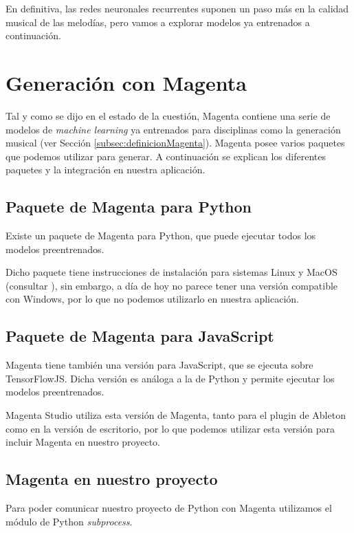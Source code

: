     En definitiva, las redes neuronales recurrentes suponen un paso más en la calidad musical de las melodías, pero vamos a explorar modelos ya entrenados a continuación.

\section{Generación con Magenta}
\label{sec:magenta}
Tal y como se dijo en el estado de la cuestión, Magenta contiene una serie de modelos de \textit{machine learning} ya entrenados para disciplinas como la generación musical (ver Sección \ref{subsec:definicionMagenta}). Magenta posee varios paquetes que podemos utilizar para generar. A continuación se explican los diferentes paquetes y la integración en nuestra aplicación.

    \subsection{Paquete de Magenta para Python}
    \label{subsec:magentaPython}
    Existe un paquete de Magenta para Python, que puede ejecutar todos los modelos preentrenados.

    Dicho paquete tiene instrucciones de instalación para sistemas Linux y MacOS (consultar \cite{MagentaRepo}), sin embargo, a día de hoy no parece tener una versión compatible con Windows, por lo que no podemos utilizarlo en nuestra aplicación.

    \subsection{Paquete de Magenta para JavaScript}
    \label{subsec:magentaJS}
    Magenta tiene también una versión para JavaScript, que se ejecuta sobre TensorFlowJS. Dicha versión es análoga a la de Python y permite ejecutar los modelos preentrenados.

    Magenta Studio utiliza esta versión de Magenta, tanto para el plugin de Ableton como en la versión de escritorio, por lo que podemos utilizar esta versión para incluir Magenta en nuestro proyecto.

    \subsection{Magenta en nuestro proyecto}
    \label{subsec:magentaEnNuestroProyecto}
    Para poder comunicar nuestro proyecto de Python con Magenta utilizamos el módulo de Python \textit{subprocess}.

